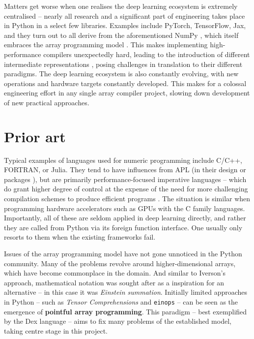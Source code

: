 Matters get worse when one realises the deep learning ecosystem is extremely centralised -- nearly all research and a significant part of engineering takes place in Python in a select few libraries. Examples include PyTorch, TensorFlow, Jax, and they turn out to all derive from the aforementioned NumPy \cite{frostig2018compiling, paszke2019pytorch, abadi2016tensorflow}, which itself embraces the array programming model \cite{harris2020array}. 
This makes implementing high-performance compilers unexpectedly hard, leading to the introduction of different intermediate representations \cite{feng2023tensorir}, posing challenges in translation to their different paradigms. The deep learning ecosystem is also constantly evolving, with new operations and hardware targets constantly developed. This makes for a colossal engineering effort in any single array compiler project, slowing down development of new practical approaches.

\section{Prior art}

Typical examples of languages used for numeric programming include C/C++, FORTRAN, or Julia. They tend to have influences from APL (in their design \cite{bernecky1991fortran} or packages \cite{eigenweb}), but are primarily performance-focused imperative languages -- which do grant higher degree of control at the expense of the need for more challenging compilation schemes to produce efficient programs \cite{grosser2012polly}. The situation is similar when programming hardware accelerators such as GPUs with the C family languages. Importantly, all of these are seldom applied in deep learning directly, and rather they are called from Python via its foreign function interface. One usually only resorts to them when the existing frameworks fail.

Issues of the array programming model have not gone unnoticed in the Python community. Many of the problems revolve around higher-dimensional arrays, which have become commonplace in the domain. And similar to Iverson's approach, mathematical notation was sought after as a inspiration for an alternative -- in this case it was \textit{Einstein summation}. Initially limited approaches in Python -- such as \textit{Tensor Comprehensions} \cite{vasilache2018tensor} and \texttt{einops} \cite{rogozhnikov2021einops} -- can be seen as the emergence of \textbf{pointful array programming}. This paradigm -- best exemplified by the Dex language \cite{paszke2021getting} -- aims to fix many problems of the established model, taking centre stage in this project. 

